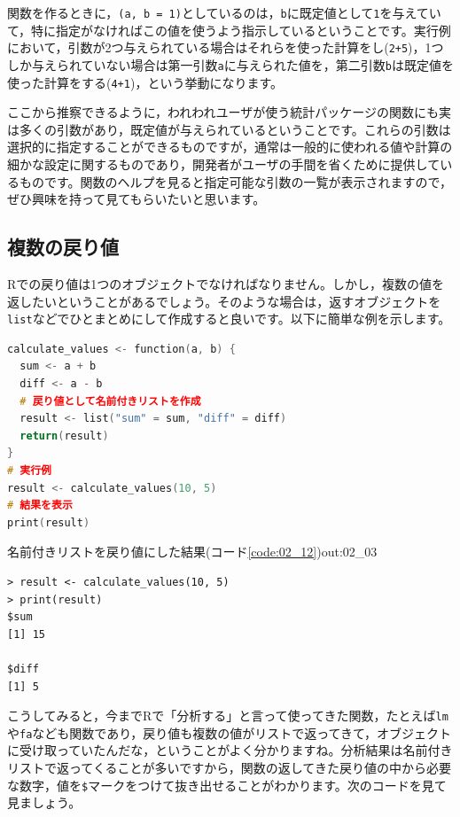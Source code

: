 \documentclass{ltjsbook}
\begin{document}
関数を作るときに，\verb|(a, b = 1)|としているのは，\verb|b|に既定値として\verb|1|を与えていて，特に指定がなければこの値を使うよう指示しているということです。実行例において，引数が2つ与えられている場合はそれらを使った計算をし(\verb|2+5|)，1つしか与えられていない場合は第一引数\verb|a|に与えられた値を，第二引数\verb|b|は既定値を使った計算をする(\verb|4+1|)，という挙動になります。

ここから推察できるように，われわれユーザが使う統計パッケージの関数にも実は多くの引数があり，既定値が与えられているということです。これらの引数は選択的に指定することができるものですが，通常は一般的に使われる値や計算の細かな設定に関するものであり，開発者がユーザの手間を省くために提供しているものです。関数のヘルプを見ると指定可能な引数の一覧が表示されますので，ぜひ興味を持って見てもらいたいと思います。

\subsection{複数の戻り値}

Rでの戻り値は1つのオブジェクトでなければなりません。しかし，複数の値を返したいということがあるでしょう。そのような場合は，返すオブジェクトを\verb|list|などでひとまとめにして作成すると良いです。以下に簡単な例を示します。

\begin{lstlisting}[language=c++,label={code:02_12},caption={複数の値を戻り値にする}]
calculate_values <- function(a, b) {
  sum <- a + b
  diff <- a - b
  # 戻り値として名前付きリストを作成
  result <- list("sum" = sum, "diff" = diff)
  return(result)
}
# 実行例
result <- calculate_values(10, 5)
# 結果を表示
print(result)
\end{lstlisting}

\begin{Rscreen}{名前付きリストを戻り値にした結果(コード\ref{code:02_12})}{out:02_03}
	\begin{verbatim}
> result <- calculate_values(10, 5)
> print(result)
$sum
[1] 15

$diff
[1] 5
\end{verbatim}
\end{Rscreen}

こうしてみると，今までRで「分析する」と言って使ってきた関数，たとえば\verb|lm|や\verb|fa|なども関数であり，戻り値も複数の値がリストで返ってきて，オブジェクトに受け取っていたんだな，ということがよく分かりますね。分析結果は名前付きリストで返ってくることが多いですから，関数の返してきた戻り値の中から必要な数字，値を\verb|$|マークをつけて抜き出せることがわかります。次のコードを見て見ましょう。
\end{document}
